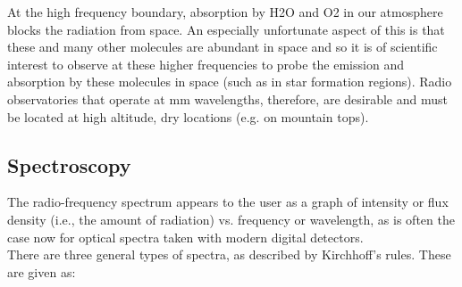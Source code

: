 \documentclass[10pt]{report}
\begin{document}
At the high frequency boundary, absorption by H2O and O2 in our atmosphere blocks the radiation from space.  An especially unfortunate aspect of this is that these and many other molecules are abundant in space and so it is of scientific interest to observe at these higher frequencies to probe the emission and absorption by these molecules in space (such as in star formation regions).   Radio observatories that operate at mm wavelengths, therefore, are desirable and must be located at high altitude, dry locations (e.g. on mountain tops). 

\subsection{Spectroscopy} 
The radio-frequency spectrum appears to the user as a graph of intensity or flux density (i.e., the amount of radiation) vs. frequency or wavelength, as is often the case now for optical spectra taken with modern digital detectors.\\
There are three general types of spectra, as described by Kirchhoff’s rules. These are given as:
\end{document}

